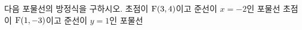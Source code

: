 다음 포물선의 방정식을 구하시오.
 초점이 $\mathrm{F}(3{,}\mkern3mu\mathopen{}4)$이고 준선이 $x=-2$인 포물선
 초점이 $\mathrm{F}(1{,}\mkern3mu\mathopen{}-3)$이고 준선이 $y=1$인 포물선
